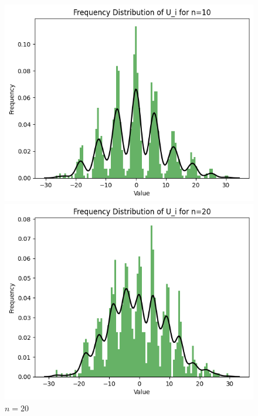 \documentclass{article}
\begin{document}
\begin{figure}[H]
\begin{minipage}[b]{0.3\linewidth}
        \includegraphics[width=\linewidth]{figure/n=10.png}
        \caption{$n=10$}
    \end{minipage}
    \hfill
    \begin{minipage}[b]{0.3\linewidth}
        \centering
        \includegraphics[width=\linewidth]{figure/n=20.png}
        \caption{$n=20$}
    \end{minipage}
    \vspace{4mm} %
    \begin{minipage}[b]{0.3\linewidth}
        \centering

\end{minipage}
\end{figure}
\end{document}

